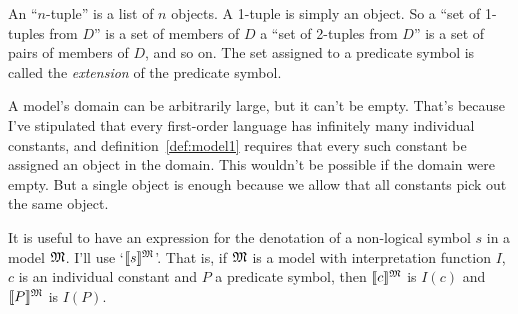 An ``$n$-tuple'' is a list of $n$ objects.
A 1-tuple is simply an object.
So a ``set of 1-tuples from $D$'' is a set of members of $D$
a ``set of 2-tuples from $D$'' is a set of pairs of members of $D$,
and so on.
The set assigned to a predicate symbol is called the \emph{extension} of the predicate symbol.


A model's domain can be arbitrarily large, but it can't be empty.
That's because I've stipulated that
every first-order language has infinitely many individual constants,
and definition~\ref{def:model1} requires that
every such constant be assigned an object in the domain.
This wouldn't be possible if the domain were empty.
But a single object is enough because
we allow that all constants pick out the same object.



It is useful to have an expression for the denotation of a non-logical symbol $s$ in a model $\mathfrak{M}$.
I'll use `$\llbracket s \rrbracket^{\mathfrak{M}}$'.
That is,
if $\mathfrak{M}$ is a model with interpretation function $I$,
$c$ is an individual constant and $P$ a predicate symbol,
then $\llbracket c \rrbracket^{\mathfrak{M}}$ is $I(c)$
and $\llbracket P \rrbracket^{\mathfrak{M}}$ is $I(P)$.

